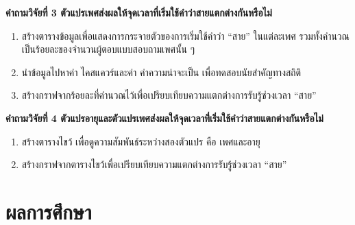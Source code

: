 \documentclass[a4paper]{article}
\begin{document}
    \textbf{คำถามวิจัยที่ 3 ตัวแปรเพศส่งผลให้จุดเวลาที่เริ่มใช้คำว่าสายแตกต่างกันหรือไม่}
    \begin{enumerate}
        \item สร้างตารางข้อมูลเพื่อแสดงการกระจายตัวของการเริ่มใช้คำว่า “สาย” ในแต่ละเพศ รวมทั้งคำนวณเป็นร้อยละของจำนวนผู้ตอบแบบสอบถามเพศนั้น ๆ
        \item นำข้อมูลไปหาค่า ไคสแควร์และค่า  ค่าความน่าจะเป็น เพื่อทดสอบนัยสำคัญทางสถิติ
        \item สร้างกราฟจากร้อยละที่คำนวณไว้เพื่อเปรียบเทียบความแตกต่างการรับรู้ช่วงเวลา “สาย”
    \end{enumerate}

    \textbf{คำถามวิจัยที่ 4 ตัวแปรอายุและตัวแปรเพศส่งผลให้จุดเวลาที่เริ่มใช้คำว่าสายแตกต่างกันหรือไม่}
    \begin{enumerate}
        \item สร้างตารางไขว้ เพื่อดูความสัมพันธ์ระหว่างสองตัวแปร คือ เพศและอายุ
        \item สร้างกราฟจากตารางไขว้เพื่อเปรียบเทียบความแตกต่างการรับรู้ช่วงเวลา “สาย”
    \end{enumerate}
\section{ผลการศึกษา}
\end{document}

